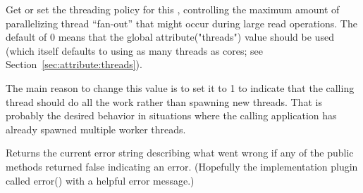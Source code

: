 Get or set the threading policy for this \ImageInput, controlling the
maximum amount of parallelizing thread ``fan-out'' that might occur during
large read operations. The default of 0 means that the global
{\cf attribute("threads")} value should be used (which itself defaults to
using as many threads as cores; see Section~\ref{sec:attribute:threads}).

The main reason to change this value is to set it to 1 to indicate that the
calling thread should do all the work rather than spawning new threads. That
is probably the desired behavior in situations where the calling application
has already spawned multiple worker threads.
\apiend

Returns the current error string describing what went wrong if
any of the public methods returned {\kw false} indicating an error.
(Hopefully the implementation plugin called {\kw error()} with a
helpful error message.)
\apiend


\chapwidthend
